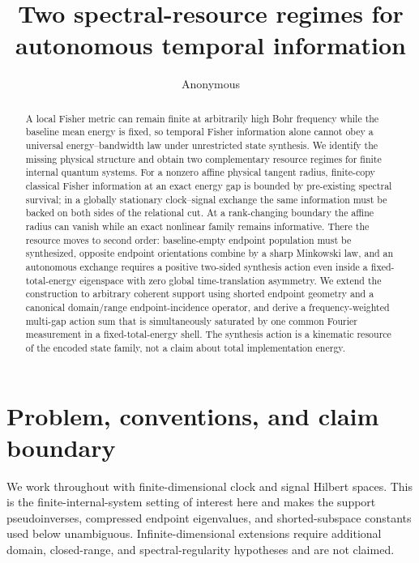 \documentclass[aps,pra,preprint,nofootinbib]{revtex4-2}
\begin{document}
\title{Two spectral-resource regimes for autonomous temporal information}

\author{Anonymous}

\begin{abstract}
A local Fisher metric can remain finite at arbitrarily high Bohr frequency while the baseline mean energy is fixed, so temporal Fisher information alone cannot obey a universal energy--bandwidth law under unrestricted state synthesis. We identify the missing physical structure and obtain two complementary resource regimes for finite internal quantum systems. For a nonzero affine physical tangent radius, finite-copy classical Fisher information at an exact energy gap is bounded by pre-existing spectral survival; in a globally stationary clock--signal exchange the same information must be backed on both sides of the relational cut. At a rank-changing boundary the affine radius can vanish while an exact nonlinear family remains informative. There the resource moves to second order: baseline-empty endpoint population must be synthesized, opposite endpoint orientations combine by a sharp Minkowski law, and an autonomous exchange requires a positive two-sided synthesis action even inside a fixed-total-energy eigenspace with zero global time-translation asymmetry. We extend the construction to arbitrary coherent support using shorted endpoint geometry and a canonical domain/range endpoint-incidence operator, and derive a frequency-weighted multi-gap action sum that is simultaneously saturated by one common Fourier measurement in a fixed-total-energy shell. The synthesis action is a kinematic resource of the encoded state family, not a claim about total implementation energy.
\end{abstract}

\maketitle

\section{Problem, conventions, and claim boundary}
\label{sec:model}

We work throughout with finite-dimensional clock and signal Hilbert spaces. This is the finite-internal-system setting of interest here and makes the support pseudoinverses, compressed endpoint eigenvalues, and shorted-subspace constants used below unambiguous. Infinite-dimensional extensions require additional domain, closed-range, and spectral-regularity hypotheses and are not claimed.
\end{document}
